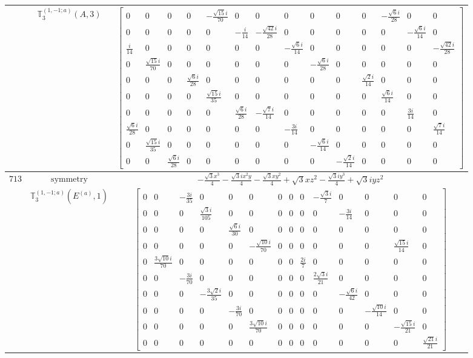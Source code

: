 \documentclass[fleqn,8pt,landscape]{jsarticle}
\begin{document}
\begin{longtable}{ccc}
$  $ & $ \mathbb{T}_{3}^{(1,-1;a)}(A,3) $ & $ \begin{bmatrix} 0 & 0 & 0 & 0 & - \frac{\sqrt{15} i}{70} & 0 & 0 & 0 & 0 & 0 & 0 & - \frac{\sqrt{6} i}{28} & 0 & 0 \\ 0 & 0 & 0 & 0 & 0 & - \frac{i}{14} & - \frac{\sqrt{42} i}{28} & 0 & 0 & 0 & 0 & 0 & - \frac{\sqrt{6} i}{14} & 0 \\ \frac{i}{14} & 0 & 0 & 0 & 0 & 0 & 0 & - \frac{\sqrt{6} i}{14} & 0 & 0 & 0 & 0 & 0 & - \frac{\sqrt{42} i}{28} \\ 0 & \frac{\sqrt{15} i}{70} & 0 & 0 & 0 & 0 & 0 & 0 & - \frac{\sqrt{6} i}{28} & 0 & 0 & 0 & 0 & 0 \\ 0 & 0 & 0 & \frac{\sqrt{6} i}{28} & 0 & 0 & 0 & 0 & 0 & 0 & \frac{\sqrt{2} i}{14} & 0 & 0 & 0 \\ 0 & 0 & 0 & 0 & \frac{\sqrt{15} i}{35} & 0 & 0 & 0 & 0 & 0 & 0 & \frac{\sqrt{6} i}{14} & 0 & 0 \\ 0 & 0 & 0 & 0 & 0 & \frac{\sqrt{6} i}{28} & - \frac{\sqrt{7} i}{14} & 0 & 0 & 0 & 0 & 0 & \frac{3 i}{14} & 0 \\ \frac{\sqrt{6} i}{28} & 0 & 0 & 0 & 0 & 0 & 0 & - \frac{3 i}{14} & 0 & 0 & 0 & 0 & 0 & \frac{\sqrt{7} i}{14} \\ 0 & \frac{\sqrt{15} i}{35} & 0 & 0 & 0 & 0 & 0 & 0 & - \frac{\sqrt{6} i}{14} & 0 & 0 & 0 & 0 & 0 \\ 0 & 0 & \frac{\sqrt{6} i}{28} & 0 & 0 & 0 & 0 & 0 & 0 & - \frac{\sqrt{2} i}{14} & 0 & 0 & 0 & 0 \end{bmatrix} $ \\ \hline
$ 713 $ & $ \text{symmetry} $ & $ - \frac{\sqrt{3} x^{3}}{4} - \frac{\sqrt{3} i x^{2} y}{4} - \frac{\sqrt{3} x y^{2}}{4} + \sqrt{3} x z^{2} - \frac{\sqrt{3} i y^{3}}{4} + \sqrt{3} i y z^{2} $ \\
$  $ & $ \mathbb{T}_{3}^{(1,-1;a)}(E^{(a)},1) $ & $ \begin{bmatrix} 0 & 0 & - \frac{3 i}{35} & 0 & 0 & 0 & 0 & 0 & 0 & - \frac{\sqrt{3} i}{7} & 0 & 0 & 0 & 0 \\ 0 & 0 & 0 & \frac{\sqrt{3} i}{105} & 0 & 0 & 0 & 0 & 0 & 0 & - \frac{3 i}{14} & 0 & 0 & 0 \\ 0 & 0 & 0 & 0 & \frac{\sqrt{6} i}{30} & 0 & 0 & 0 & 0 & 0 & 0 & 0 & 0 & 0 \\ 0 & 0 & 0 & 0 & 0 & - \frac{\sqrt{10} i}{70} & 0 & 0 & 0 & 0 & 0 & 0 & \frac{\sqrt{15} i}{14} & 0 \\ 0 & \frac{3 \sqrt{10} i}{70} & 0 & 0 & 0 & 0 & 0 & 0 & \frac{2 i}{7} & 0 & 0 & 0 & 0 & 0 \\ 0 & 0 & - \frac{3 i}{70} & 0 & 0 & 0 & 0 & 0 & 0 & \frac{2 \sqrt{3} i}{21} & 0 & 0 & 0 & 0 \\ 0 & 0 & 0 & - \frac{3 \sqrt{2} i}{35} & 0 & 0 & 0 & 0 & 0 & 0 & - \frac{\sqrt{6} i}{42} & 0 & 0 & 0 \\ 0 & 0 & 0 & 0 & - \frac{3 i}{70} & 0 & 0 & 0 & 0 & 0 & 0 & - \frac{\sqrt{10} i}{14} & 0 & 0 \\ 0 & 0 & 0 & 0 & 0 & \frac{3 \sqrt{10} i}{70} & 0 & 0 & 0 & 0 & 0 & 0 & - \frac{\sqrt{15} i}{21} & 0 \\ 0 & 0 & 0 & 0 & 0 & 0 & 0 & 0 & 0 & 0 & 0 & 0 & 0 & \frac{\sqrt{21} i}{21} \end{bmatrix} $ \\ \hline

\end{longtable}
\end{document}
